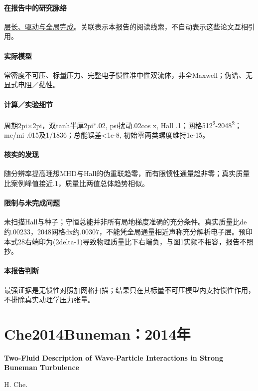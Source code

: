 \documentclass[UTF8,a4paper,11pt,openany,fontset=fandol]{ctexbook}
\begin{document}
\paragraph{在报告中的研究脉络}\hyperref[story:global]{层长、驱动与全局完成}。关联表示本报告的阅读线索，不自动表示这些论文互相引用。

\paragraph{实际模型}常密度不可压、标量压力、完整电子惯性准中性双流体，非全Maxwell；伪谱、无显式电阻／黏性。

\paragraph{计算／实验细节}周期2pi×2pi，双tanh半厚2pi*.02, psi扰动.02cos x, Hall .1；网格512\textsuperscript{2}-2048\textsuperscript{2}；me/mi .015及1/1836；总能误差<1e-8, 初始零两类螺度维持1e-15。

\paragraph{核实的发现}随分辨率提高理想MHD与Hall的伪重联趋零，而有限惯性通量趋非零；真实质量比案例峰值接近.1，质量比两值总体趋势相似。

\paragraph{限制与未完成问题}未扫描Hall与种子；守恒总能并非所有局地梯度准确的充分条件。真实质量比de约.00233，2048网格dx约.00307，不能凭全局通量相近声称充分解析电子层。预印本式28右端印为(2delta-1)导致物理质量比下右端负，与图1实频不相容，报告不照抄。

\paragraph{本报告判断}最强证据是无惯性对照加网格扫描；结果只在其标量不可压模型内支持惯性作用，不排除真实动理学压力张量。

\section{Che2014Buneman：2014年}\label{paper:Che2014Buneman}

\textbf{Two-Fluid Description of Wave-Particle Interactions in Strong Buneman Turbulence}\citep{Che2014Buneman}\

H. Che.
\end{document}
